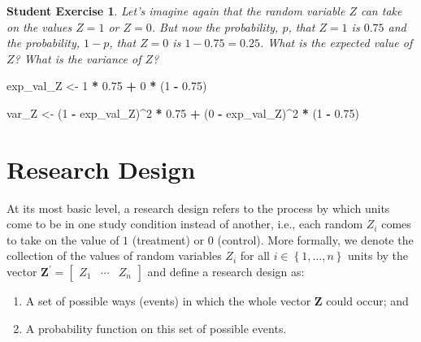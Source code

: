\documentclass[12pt,leqno]{article}
\newenvironment{Shaded}{\begin{snugshade}}{\end{snugshade}}
\newcommand{\DecValTok}[1]{\textcolor[rgb]{0.00,0.00,0.81}{#1}}
\newcommand{\FloatTok}[1]{\textcolor[rgb]{0.00,0.00,0.81}{#1}}
\newcommand{\NormalTok}[1]{#1}
\newcommand{\OperatorTok}[1]{\textcolor[rgb]{0.81,0.36,0.00}{\textbf{#1}}}
\newcommand{\StringTok}[1]{\textcolor[rgb]{0.31,0.60,0.02}{#1}}
\theoremstyle{newstyle}
\begin{document}
\newtheorem{student_exercise}{Student Exercise}
\begin{student_exercise}
Let's imagine again that the random variable $Z$ can take on the values $Z = 1$ or $Z = 0$. But now the probability, $p$, that $Z = 1$ is $0.75$ and the probability, $1 - p$, that $Z = 0$ is $1 - 0.75 = 0.25$. What is the expected value of $Z$? What is the variance of $Z$?
\end{student_exercise}

\begin{Shaded}
\begin{Highlighting}[]
\NormalTok{exp_val_Z <-}\StringTok{ }\DecValTok{1} \OperatorTok{*}\StringTok{ }\FloatTok{0.75} \OperatorTok{+}\StringTok{ }\DecValTok{0} \OperatorTok{*}\StringTok{ }\NormalTok{(}\DecValTok{1} \OperatorTok{-}\StringTok{ }\FloatTok{0.75}\NormalTok{)}

\NormalTok{var_Z <-}\StringTok{ }\NormalTok{(}\DecValTok{1} \OperatorTok{-}\StringTok{ }\NormalTok{exp_val_Z)}\OperatorTok{^}\DecValTok{2} \OperatorTok{*}\StringTok{ }\FloatTok{0.75} \OperatorTok{+}\StringTok{ }\NormalTok{(}\DecValTok{0} \OperatorTok{-}\StringTok{ }\NormalTok{exp_val_Z)}\OperatorTok{^}\DecValTok{2} \OperatorTok{*}\StringTok{ }\NormalTok{(}\DecValTok{1} \OperatorTok{-}\StringTok{ }\FloatTok{0.75}\NormalTok{)}
\end{Highlighting}
\end{Shaded}

\hypertarget{research-design}{%
\section{Research Design}\label{research-design}}

At its most basic level, a research design refers to the process by
which units come to be in one study condition instead of another, i.e.,
each random \(Z_i\) comes to take on the value of \(1\) (treatment) or
\(0\) (control). More formally, we denote the collection of the values
of random variables \(Z_i\) for all
\(i \in \left\{1, \ldots , n\right\}\) units by the vector
\(\mathbf{Z}^{\prime} = \begin{bmatrix} Z_1 & \cdots & Z_n \end{bmatrix}\)
and define a research design as:

\begin{enumerate}

\item A set of possible ways (events) in which the whole vector $\mathbf{Z}$ could occur; and 

\item A probability function on this set of possible events.

\end{enumerate}
\end{document}
